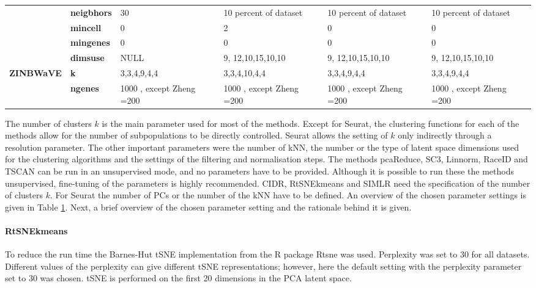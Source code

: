 \documentclass[11pt, a4paper]{article}\usepackage[]{graphicx}\usepackage[]{color}
\begin{document}
\begin{table}[htbp]
{\begin{tabular}{rp{5.585em}llll}
          & \textbf{neigbhors} & 30    & \multicolumn{1}{p{10.165em}}{10 percent of dataset} & \multicolumn{1}{p{9.085em}}{10 percent of dataset} & \multicolumn{1}{p{9.835em}}{10 percent of dataset} \\
          & \textbf{mincell} & 0     & 2     & 0     & 0 \\
          & \textbf{mingenes} & 0     & 0     & 0     & 0 \\
          & \textbf{dimsuse} & NULL  & 9, 12,10,15,10,10 & 9, 12,10,15,10,10 & 9, 12,10,15,10,10 \\
    \midrule
    \multicolumn{1}{l}{\textbf{ZINBWaVE}} & \textbf{k} & \multicolumn{1}{p{13.335em}}{3,3,4,9,4,4} & 3,3,4,10,4,4 & \multicolumn{1}{p{9.085em}}{3,3,4,9,4,4} & \multicolumn{1}{p{9.835em}}{3,3,4,9,4,4} \\
          & \textbf{ngenes} & 1000 , except Zheng =200 & 1000 , except Zheng =200 & 1000 , except Zheng =200 & 1000 , except Zheng =200 \\
    \bottomrule
    \end{tabular}}%
  \label{tab:parameter}%
\end{table}%

The number of clusters $k$ is the main parameter used for most of the methods. Except for Seurat, the clustering functions for each of the methods allow for the number of subpopulations to be directly controlled. Seurat allows the setting of $k$ only indirectly through a resolution parameter. 
The other important parameters were the number of kNN, the number or the type of latent space dimensions used for the clustering algorithms and the settings of the filtering and normalisation steps. The methods pcaReduce, SC3, Linnorm, RaceID and TSCAN can be run in an unsupervised mode, and no parameters have to be provided. Although it is possible to run these the methods unsupervised, fine-tuning of the parameters is highly recommended. CIDR, RtSNEkmeans and SIMLR need the specification of the number of clusters $k$.
For Seurat the number of PCs or the number of the kNN have to be defined. An overview of the chosen parameter settings is given in Table \ref{tab:parameter}.
Next, a brief overview of the chosen parameter setting and the rationale behind it is given.
\paragraph{RtSNEkmeans}
To reduce the run time the Barnes-Hut tSNE implementation from the R package Rtsne was used. Perplexity was set to 30 for all datasets. Different values of the perplexity can give different tSNE representations; however, here the default setting with the perplexity parameter set to 30 was chosen. tSNE is performed on the first 20 dimensions in the PCA latent space. 
\end{document}
